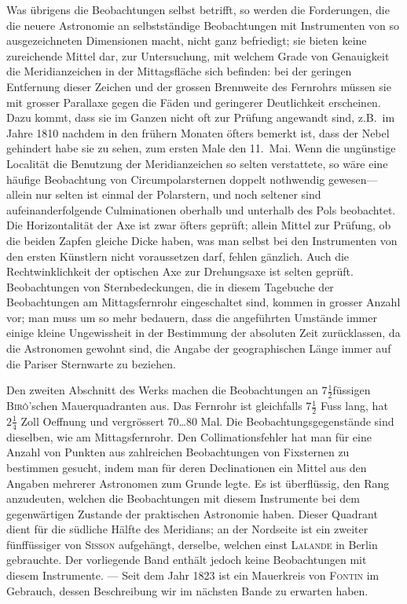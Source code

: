 \documentclass[12pt,a4paper]{article}
\begin{document}
Was \"ubrigens die Beobachtungen selbst betrifft, so werden die Forderungen, die die neuere Astronomie an selbstst\"andige Beobachtungen mit Instrumenten von so ausgezeichneten Dimensionen macht, nicht ganz befriedigt; sie bieten keine zureichende Mittel dar, zur Untersuchung, mit welchem Grade von Genauigkeit die Meridianzeichen in der Mittagsfl\"ache sich befinden: bei der geringen Entfernung dieser Zeichen und der grossen Brennweite des Fernrohrs m\"ussen sie mit grosser Parallaxe gegen die F\"aden und geringerer Deutlichkeit erscheinen. Dazu kommt, dass sie im Ganzen nicht oft zur Pr\"ufung angewandt sind, z.B.\ im Jahre 1810 nachdem in den fr\"uhern Monaten \"ofters bemerkt ist, dass der Nebel gehindert habe sie zu sehen, zum ersten Male den 11.\ Mai. Wenn die ung\"unstige Localit\"at die Benutzung der Meridianzeichen so selten verstattete, so w\"are eine h\"aufige Beobachtung von Circumpolarsternen doppelt nothwendig gewesen---allein nur selten ist einmal der Polarstern, und noch seltener sind aufeinanderfolgende Culminationen oberhalb und unterhalb des Pols beobachtet. Die Horizontalit\"at der Axe ist zwar \"ofters gepr\"uft; allein Mittel zur Pr\"ufung, ob die beiden Zapfen gleiche Dicke haben, was man selbst bei den Instrumenten von den ersten K\"unstlern nicht voraussetzen darf, fehlen g\"anzlich. Auch die Rechtwinklichkeit der optischen Axe zur Drehungsaxe ist selten gepr\"uft. Beobachtungen von Sternbedeckungen, die in diesem Tagebuche der Beobachtungen am Mittagsfernrohr eingeschaltet sind, kommen in grosser Anzahl vor; man muss um so mehr bedauern, dass die angef\"uhrten Umst\"ande immer einige kleine Ungewissheit in der Bestimmung der absoluten Zeit zur\"ucklassen, da die Astronomen gewohnt sind, die Angabe der geographischen L\"ange immer auf die Pariser Sternwarte zu beziehen.

Den zweiten Abschnitt des Werks machen die Beobachtungen an $7\frac{1}{2}$f\"ussigen \textsc{Bir\^o}'schen Mauerquadranten aus. Das Fernrohr ist gleichfalls $7\frac{1}{2}$ Fuss lang, hat $2\frac{1}{4}$ Zoll Oeffnung und vergr\"ossert 70\dots 80 Mal. Die Beobachtungsgegenst\"ande sind dieselben, wie am Mittagsfernrohr. Den Collimationsfehler hat man f\"ur eine Anzahl von Punkten aus zahlreichen Beobachtungen von Fixsternen zu bestimmen gesucht, indem man f\"ur deren Declinationen ein Mittel aus den Angaben mehrerer Astronomen zum Grunde legte. Es ist \"uberfl\"ussig, den Rang anzudeuten, welchen die Beobachtungen mit diesem Instrumente bei dem gegenw\"artigen Zustande der praktischen Astronomie haben. Dieser Quadrant dient f\"ur die s\"udliche H\"alfte des Meridians; an der Nordseite ist ein zweiter f\"unff\"ussiger von \textsc{Sisson} aufgeh\"angt, derselbe, welchen einst \textsc{Lalande} in Berlin gebrauchte. Der vorliegende Band enth\"alt jedoch keine Beobachtungen mit diesem Instrumente. --- Seit dem Jahr 1823 ist ein Mauerkreis von \textsc{Fontin} im Gebrauch, dessen Beschreibung wir im n\"achsten Bande zu erwarten haben.
\end{document}
